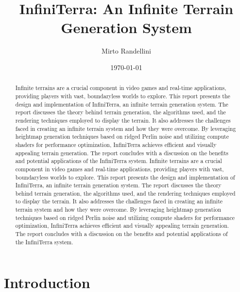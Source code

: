 \documentclass{article}
\title{InfiniTerra: An Infinite Terrain Generation System}
\author{Mirto Randellini}
\date{\today}
\begin{document}
\maketitle

\tableofcontents

\newpage

\newpage

\begin{abstract}
	Infinite terrains are a crucial component in video games and real-time applications, providing
	players with vast, boundaryless worlds to explore. This report presents the design and 
	implementation of InfiniTerra, an infinite terrain generation system. The report discusses the 
	theory behind terrain generation, the algorithms used, and the rendering techniques employed to 
	display the terrain. It also addresses the challenges faced in creating an infinite terrain 
	system and how they were overcome. By leveraging heightmap generation techniques based on ridged 
	Perlin noise and utilizing compute shaders for performance optimization, InfiniTerra achieves 
	efficient and visually appealing terrain generation. The report concludes with a discussion on 
	the benefits and potential applications of the InfiniTerra system.
	Infinite terrains are a crucial component in video games and real-time applications, providing
	players with vast, boundaryless worlds to explore. This report presents the design and 
	implementation of InfiniTerra, an infinite terrain generation system. The report discusses the 
	theory behind terrain generation, the algorithms used, and the rendering techniques employed to 
	display the terrain. It also addresses the challenges faced in creating an infinite terrain 
	system and how they were overcome. By leveraging heightmap generation techniques based on ridged 
	Perlin noise and utilizing compute shaders for performance optimization, InfiniTerra achieves 
	efficient and visually appealing terrain generation. The report concludes with a discussion on 
	the benefits and potential applications of the InfiniTerra system.
\end{abstract}

\section{Introduction}
\end{document}
